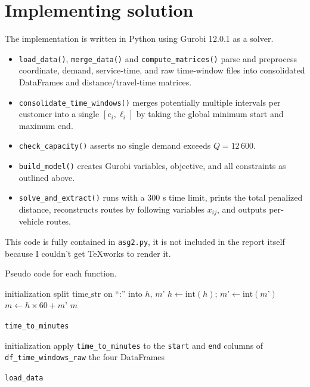 \documentclass[a4paper,11pt]{article}
\newcounter{algorithm}
\begin{document}
\section{Implementing solution}
The implementation is written in Python using Gurobi 12.0.1 as a solver.
\begin{itemize}
  \item \texttt{load\_data()}, \texttt{merge\_data()} and \texttt{compute\_matrices()} parse and preprocess coordinate, demand, service‐time, and raw time‐window files into consolidated DataFrames and distance/travel‐time matrices.  
  \item \texttt{consolidate\_time\_windows()} merges potentially multiple intervals per customer into a single \([e_i,\ell_i]\) by taking the global minimum start and maximum end.  
  \item \texttt{check\_capacity()} asserts no single demand exceeds \(Q=12\,600\).  
  \item \texttt{build\_model()} creates Gurobi variables, objective, and all constraints as outlined above.  
  \item \texttt{solve\_and\_extract()} runs with a 300 s time limit, prints the total penalized distance, reconstructs routes by following variables \(x_{ij}\), and outputs per‐vehicle routes.  
\end{itemize}
This code is fully contained in \texttt{asg2.py}, it is not included in the report itself because I couldn't get TeXworks to render it.

\newpage
 Pseudo code for each function.
 \\
\begin{algorithm}[H]
 initialization\;
 split $\text{time\_str}$ on “:” into $h,\,m’$\;
 $h \leftarrow \text{int}(h)$; \quad $m’ \leftarrow \text{int}(m’)$\;
 $m \leftarrow h \times 60 + m’$\;
 \Return $m$\;
 \caption{ \texttt{time\_to\_minutes}}
\end{algorithm}

\begin{algorithm}[H]
 initialization\;
 apply \texttt{time\_to\_minutes} to the \texttt{start} and \texttt{end} columns of \texttt{df\_time\_windows\_raw}\;
 \Return the four DataFrames\;
 \caption{ \texttt{load\_data}}
\end{algorithm}
\end{document}

